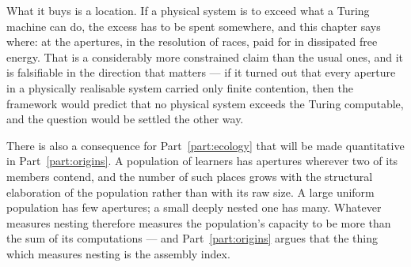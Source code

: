 What it buys is a location.
If a physical system is to exceed what a Turing machine can do, the
excess has to be spent somewhere, and this chapter says where: at the
apertures, in the resolution of races, paid for in dissipated free
energy.
That is a considerably more constrained claim than the usual ones, and it
is falsifiable in the direction that matters --- if it turned out that
every aperture in a physically realisable system carried only finite
contention, then the framework would predict that no physical system
exceeds the Turing computable, and the question would be settled the
other way.

There is also a consequence for Part~\ref{part:ecology} that will be made
quantitative in Part~\ref{part:origins}.
A population of learners has apertures wherever two of its members
contend, and the number of such places grows with the structural
elaboration of the population rather than with its raw size.
A large uniform population has few apertures; a small deeply nested one
has many.
Whatever measures nesting therefore measures the population's capacity to
be more than the sum of its computations --- and Part~\ref{part:origins}
argues that the thing which measures nesting is the assembly index.

